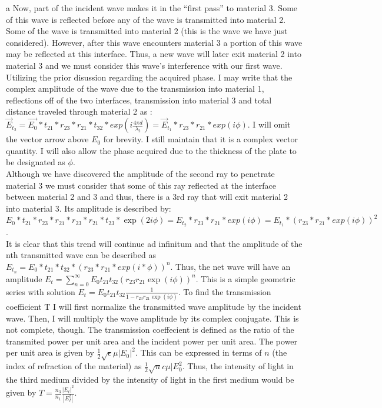 \begin{homeworkProblem}
\begin{homeworkSection}{a}
Now, part of the incident wave makes it in the ``first pass'' to material 3. Some of this wave is reflected before any of the wave is transmitted into material 2. Some of the wave is transmitted into material 2 (this is the wave we have just considered). However, after this wave encounters material 3 a portion of this wave may be reflected at this interface. Thus, a new wave will later exit material 2 into material 3 and we must consider this wave's interference with our first wave.
\\

Utilizing the prior disussion regarding the acquired phase. I may write that the complex amplitude of the wave due to the transmission into material 1, reflections off of the two interfaces, transmission into material 3 and total distance traveled through material 2 as : $\vec{E}_{t_2} = \vec{E_0}*t_{21}*r_{23}*r_{21}*t_{32}*exp(i\frac{4\pi d}{\lambda_2}) = \vec{E}_{t_1}*r_{23}*r_{21}*exp(i\phi)$. I will omit the vector arrow above $E_0$ for brevity. I still maintain that it is a complex vector quantity. I will also allow the phase acquired due to the thickness of the plate to be designated as $\phi$. 
\\

Although we have discovered the amplitude of the second ray to penetrate material 3 we must consider that some of this ray reflected at the interface between material 2 and 3 and thus, there is a 3rd ray that will exit material 2 into material 3. Its amplitude is described by: $E_0*t_{21}*r_{23}*r_{21}*r_{23}*r_{21}*t_{23}*\exp(2 i\phi) = E_{t_2}*r_{23}*r_{21}*exp(i\phi) = E_{t_1}* (r_{23}*r_{21}*exp(i\phi))^2$.
\\

It is clear that this trend will continue ad infinitum and that the amplitude of the nth transmitted wave can be described as $E_{t_n} = E_0*t_{21}*t_{32}*(r_{23}*r_{21}*exp(i*\phi))^n$. Thus, the net wave will have an amplitude $E_t = \sum\limits_{n=0}^\infty E_0 t_{21} t_{32} (r_{23}r_{21}\exp(i\phi))^n$. This is a simple geometric series with solution $E_t = E_0 t_{21} t_{32} \frac{1}{1-r_{23}r_{21}\exp(i\phi)}$. To find the transmission coefficient T I will first normalize the transmitted wave amplitude by the incident wave. Then, I will multiply the wave amplitude by its complex conjugate. This is not complete, though. The transmission coeffecient is defined as the ratio of the transmited power per unit area and the incident power per unit area. The power per unit area is given by $\frac{1}{2}\sqrt{\epsilon}{\mu}|E_0|^2$. This can be expressed in terms of $n$ (the index of refraction of the material) as $\frac{1}{2} \sqrt{n}{c\mu}|E_0^2$. Thus, the intensity of light in the third medium divided by the intensity of light in the first medium would be given by $T = \frac{n_3}{n_1} \frac{|E_t|^2}{|E_I^2|}$.
\\


\end{homeworkSection}
\end{homeworkProblem}
